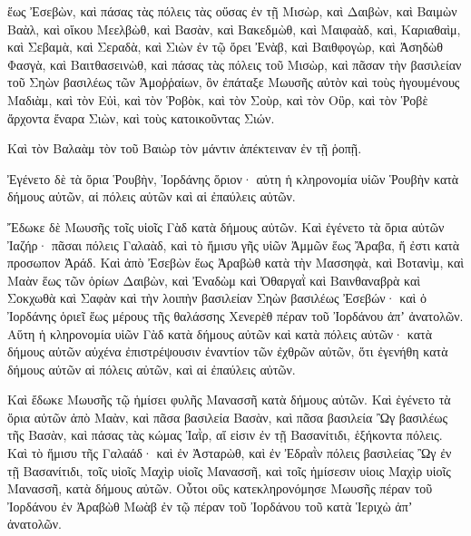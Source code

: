 {ἕως Ἐσεβὼν, καὶ πάσας τὰς πόλεις τὰς οὔσας ἐν τῇ Μισὼρ, καὶ Δαιβὼν, καὶ Βαιμὼν Βαὰλ, καὶ οἴκου Μεελβὼθ,
καὶ Βασὰν, καὶ Βακεδμὼθ, καὶ Μαιφαὰδ, καὶ, Καριαθαὶμ,
καὶ Σεβαμὰ, καὶ Σεραδὰ, καὶ Σιὼν ἐν τῷ ὄρει Ἐνὰβ,
καὶ Βαιθφογὼρ, καὶ Ἀσηδὼθ Φασγὰ, καὶ Βαιτθασεινὼθ,
καὶ πάσας τὰς πόλεις τοῦ Μισὼρ, καὶ πᾶσαν τὴν βασιλείαν τοῦ Σηὼν βασιλέως τῶν Ἀμοῤῥαίων, ὃν ἐπάταξε Μωυσῆς αὐτὸν καὶ τοὺς ἡγουμένους Μαδιὰμ, καὶ τὸν Εὐὶ, καὶ τὸν Ῥοβὸκ, καὶ τὸν Σοὺρ, καὶ τὸν Οὒρ, καὶ τὸν Ῥοβὲ ἄρχοντα ἔναρα Σιὼν, καὶ τοὺς κατοικοῦντας Σιών.
\par }{\PP {}Καὶ τὸν Βαλαὰμ τὸν τοῦ Βαιὼρ τὸν μάντιν ἀπέκτειναν ἐν τῇ ῥοπῇ.
\par }{\PP {}Ἐγένετο δὲ τὰ ὅρια Ῥουβὴν, Ἰορδάνης ὅριον· αὑτη ἡ κληρονομία υἱῶν Ῥουβὴν κατὰ δήμους αὐτῶν, αἱ πόλεις αὐτῶν καὶ αἱ ἐπαύλεις αὐτῶν.
\par }{\PP {}Ἔδωκε δὲ Μωυσῆς τοῖς υἱοῖς Γὰδ κατὰ δήμους αὐτῶν.
Καὶ ἐγένετο τὰ ὅρια αὐτῶν Ἰαζήρ· πᾶσαι πόλεις Γαλαὰδ, καὶ τὸ ἥμισυ γῆς υἱῶν Ἀμμῶν ἕως Ἄραβα, ἥ ἐστι κατὰ προσωπον Ἀράδ.
Καὶ ἀπὸ Ἐσεβὼν ἕως Ἀραβὼθ κατὰ τὴν Μασσηφὰ, καὶ Βοτανὶμ, καὶ Μαὰν ἕως τῶν ὁρίων Δαιβὼν,
καὶ Ἐναδὼμ καὶ Ὀθαργαῒ καὶ Βαινθαναβρὰ καὶ Σοκχωθὰ καὶ Σαφὰν καὶ τὴν λοιπὴν βασιλείαν Σηὼν βασιλέως Ἐσεβών· καὶ ὁ Ἰορδάνης ὁριεῖ ἕως μέρους τῆς θαλάσσης Χενερὲθ πέραν τοῦ Ἰορδάνου ἀπʼ ἀνατολῶν.
Αὕτη ἡ κληρονομία υἱῶν Γὰδ κατὰ δήμους αὐτῶν καὶ κατὰ πόλεις αὐτῶν· κατὰ δήμους αὐτῶν αὐχένα ἐπιστρέψουσιν ἐναντίον τῶν ἐχθρῶν αὐτῶν, ὅτι ἐγενήθη κατὰ δήμους αὐτῶν αἱ πόλεις αὐτῶν, καὶ αἱ ἐπαύλεις αὐτῶν.
\par }{\PP {}Καὶ ἔδωκε Μωυσῆς τῷ ἡμίσει φυλῆς Μανασσῆ κατὰ δήμους αὐτῶν.
Καὶ ἐγένετο τὰ ὅρια αὐτῶν ἀπὸ Μαὰν, καὶ πᾶσα βασιλεία Βασὰν, καὶ πᾶσα βασιλεία Ὢγ βασιλέως τῆς Βασὰν, καὶ πάσας τὰς κώμας Ἰαῒρ, αἵ εἰσιν ἐν τῇ Βασανίτιδι, ἑξήκοντα πόλεις.
Καὶ τὸ ἥμισυ τῆς Γαλαάδ· καὶ ἐν Ἀσταρὼθ, καὶ ἐν Ἐδραῒν πόλεις βασιλείας Ὢγ ἐν τῇ Βασανίτιδι, τοῖς υἱοῖς Μαχὶρ υἱοῖς Μανασσῆ, καὶ τοῖς ἡμίσεσιν υἱοις Μαχὶρ υἱοῖς Μανασσῆ, κατὰ δήμους αὐτῶν.
Οὗτοι οὓς κατεκληρονόμησε Μωυσῆς πέραν τοῦ Ἰορδάνου ἐν Ἀραβὼθ Μωὰβ ἐν τῷ πέραν τοῦ Ἰορδάνου τοῦ κατὰ Ἱεριχὼ ἀπʼ ἀνατολῶν.

}
